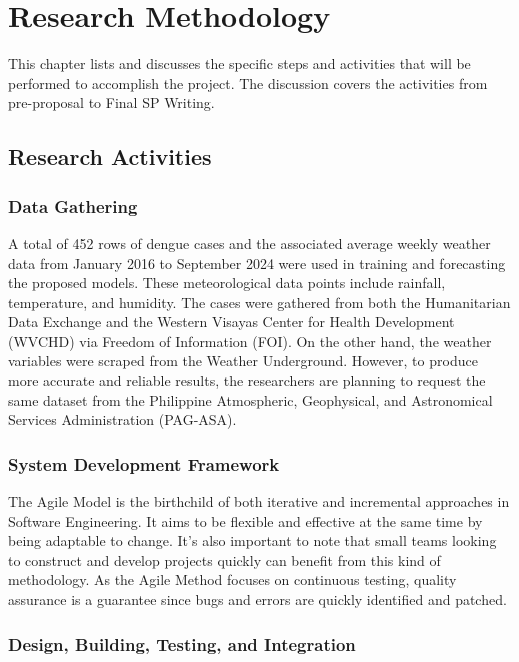 \chapter{Research Methodology}
This chapter lists and discusses the specific steps and activities that will be performed to accomplish the project. 
The discussion covers the activities from pre-proposal to Final SP Writing.

\section{Research Activities}
\subsection{Data Gathering}
A total of 452 rows of dengue cases and the associated average weekly weather data from January 2016 to September 2024 were used in training and forecasting the proposed models. These meteorological data points include rainfall, temperature, and humidity. The cases were gathered from both the Humanitarian Data Exchange and the Western Visayas Center for Health Development (WVCHD) via Freedom of Information (FOI). On the other hand, the weather variables were scraped from the Weather Underground. However, to produce more accurate and reliable results, the researchers are planning to request the same dataset from the Philippine Atmospheric, Geophysical, and Astronomical Services Administration (PAG-ASA).


\subsection{System Development Framework}
The Agile Model is the birthchild of both iterative and incremental approaches in Software Engineering. It aims to be flexible and effective at the same time by being adaptable to change. It's also important to note that small teams looking to construct and develop projects quickly can benefit from this kind of methodology. As the Agile Method focuses on continuous testing, quality assurance is a guarantee since bugs and errors are quickly identified and patched. 

\subsection{Design, Building, Testing, and Integration}

